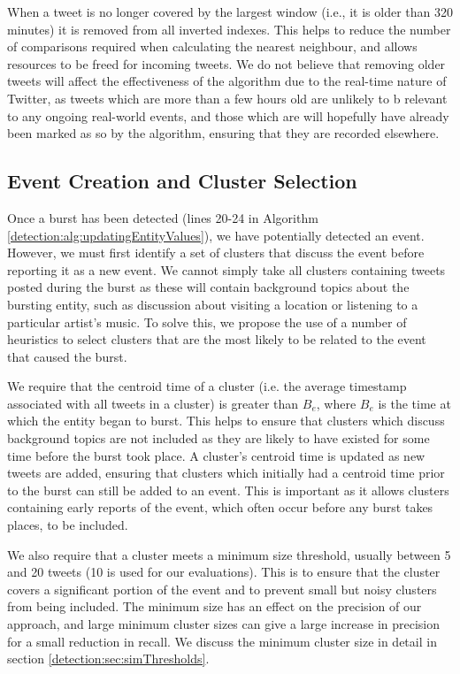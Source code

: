When a tweet is no longer covered by the largest window (i.e., it is older than 320 minutes) it is removed from all inverted indexes.
This helps to reduce the number of comparisons required when calculating the nearest neighbour, and allows resources to be freed for incoming tweets.
We do not believe that removing older tweets will affect the effectiveness of the algorithm due to the real-time nature of Twitter, as tweets which are more than a few hours old are unlikely to b relevant to any ongoing real-world events, and those which are will hopefully have already been marked as so by the algorithm, ensuring that they are recorded elsewhere.

\subsection{Event Creation and Cluster Selection}
\label{detection:sec:eventCreation}
Once a burst has been detected (lines 20-24 in Algorithm \ref{detection:alg:updatingEntityValues}), we have potentially detected an event.
However, we must first identify a set of clusters that discuss the event before reporting it as a new event.
We cannot simply take all clusters containing tweets posted during the burst as these will contain background topics about the bursting entity, such as discussion about visiting a location or listening to a particular artist's music.
To solve this, we propose the use of a number of heuristics to select clusters that are the most likely to be related to the event that caused the burst.

We require that the centroid time of a cluster (i.e. the average timestamp associated with all tweets in a cluster) is greater than \(B_e\), where \(B_e\) is the time at which the entity began to burst.
This helps to ensure that clusters which discuss background topics are not included as they are likely to have existed for some time before the burst took place.
A cluster's centroid time is updated as new tweets are added, ensuring that clusters which initially had a centroid time prior to the burst can still be added to an event.
This is important as it allows clusters containing early reports of the event, which often occur before any burst takes places, to be included.

We also require that a cluster meets a minimum size threshold, usually between 5 and 20 tweets (10 is used for our evaluations).
This is to ensure that the cluster covers a significant portion of the event and to prevent small but noisy clusters from being included. The minimum size has an effect on the precision of our approach, and large minimum cluster sizes can give a large increase in precision for a small reduction in recall.
We discuss the minimum cluster size in detail in section \ref{detection:sec:simThresholds}.

